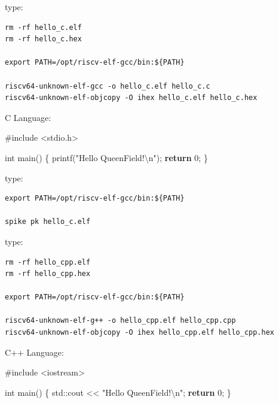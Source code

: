 \documentclass[
]{article}
\newenvironment{Shaded}{}{}
\newcommand{\BuiltInTok}[1]{#1}
\newcommand{\ControlFlowTok}[1]{\textcolor[rgb]{0.00,0.44,0.13}{\textbf{#1}}}
\newcommand{\DataTypeTok}[1]{\textcolor[rgb]{0.56,0.13,0.00}{#1}}
\newcommand{\DecValTok}[1]{\textcolor[rgb]{0.25,0.63,0.44}{#1}}
\newcommand{\ImportTok}[1]{#1}
\newcommand{\NormalTok}[1]{#1}
\newcommand{\PreprocessorTok}[1]{\textcolor[rgb]{0.74,0.48,0.00}{#1}}
\newcommand{\SpecialCharTok}[1]{\textcolor[rgb]{0.25,0.44,0.63}{#1}}
\newcommand{\StringTok}[1]{\textcolor[rgb]{0.25,0.44,0.63}{#1}}
\begin{document}
type:

\begin{verbatim}
rm -rf hello_c.elf
rm -rf hello_c.hex

export PATH=/opt/riscv-elf-gcc/bin:${PATH}

riscv64-unknown-elf-gcc -o hello_c.elf hello_c.c
riscv64-unknown-elf-objcopy -O ihex hello_c.elf hello_c.hex
\end{verbatim}

C Language:

\begin{Shaded}
\begin{Highlighting}[]
\PreprocessorTok{\#include }\ImportTok{\textless{}stdio.h\textgreater{}}

\DataTypeTok{int}\NormalTok{ main() \{}
\NormalTok{  printf(}\StringTok{"Hello QueenField!}\SpecialCharTok{\textbackslash{}n}\StringTok{"}\NormalTok{);}
  \ControlFlowTok{return} \DecValTok{0}\NormalTok{;}
\NormalTok{\}}
\end{Highlighting}
\end{Shaded}

type:

\begin{verbatim}
export PATH=/opt/riscv-elf-gcc/bin:${PATH}

spike pk hello_c.elf
\end{verbatim}

type:

\begin{verbatim}
rm -rf hello_cpp.elf
rm -rf hello_cpp.hex

export PATH=/opt/riscv-elf-gcc/bin:${PATH}

riscv64-unknown-elf-g++ -o hello_cpp.elf hello_cpp.cpp
riscv64-unknown-elf-objcopy -O ihex hello_cpp.elf hello_cpp.hex
\end{verbatim}

C++ Language:

\begin{Shaded}
\begin{Highlighting}[]
\PreprocessorTok{\#include }\ImportTok{\textless{}iostream\textgreater{}}

\DataTypeTok{int}\NormalTok{ main() \{}
  \BuiltInTok{std::}\NormalTok{cout \textless{}\textless{} }\StringTok{"Hello QueenField!}\SpecialCharTok{\textbackslash{}n}\StringTok{"}\NormalTok{;}
  \ControlFlowTok{return} \DecValTok{0}\NormalTok{;}
\NormalTok{\}}
\end{Highlighting}
\end{Shaded}
\end{document}
